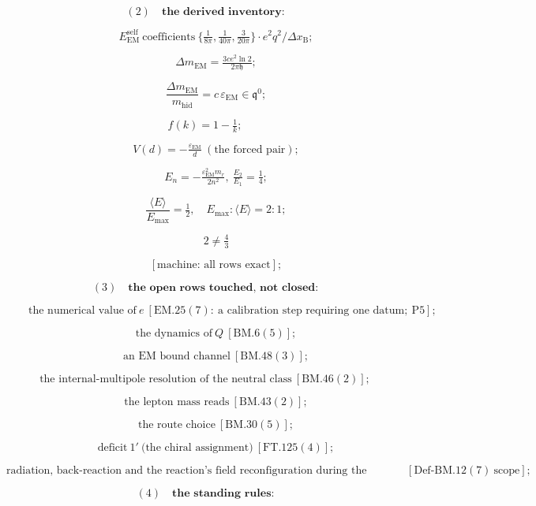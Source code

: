\documentclass[11pt,openany]{report}
\theoremstyle{canonplain}
\theoremstyle{canondef}
\begin{document}
\[
(2)\quad\textbf{the derived inventory:}
\]

\[
\qquad E_{\mathrm{EM}}^{\mathrm{self}}\ \text{coefficients}\ \bigl\{\tfrac1{8\pi},\tfrac1{40\pi},\tfrac3{20\pi}\bigr\}\cdot e^2q^2/\Delta x_{\mathrm B};
\]

\[
\qquad \Delta m_{\mathrm{EM}}=\tfrac{3ce^2\ln2}{2\pi\mathfrak h};
\]

\[
\qquad \frac{\Delta m_{\mathrm{EM}}}{m_{\mathrm{hid}}}=c\,\varepsilon_{\mathrm{EM}}\in\mathfrak q^0;
\]

\[
f(k)=1-\tfrac1k;
\]

\[
\qquad V(d)=-\tfrac{\varepsilon_{\mathrm{EM}}}d\ (\text{the forced pair});
\]

\[
\qquad E_n=-\tfrac{\varepsilon_{\mathrm{EM}}^2m_r}{2n^2},\ \tfrac{E_2}{E_1}=\tfrac14;
\]

\[
\qquad \frac{\langle E\rangle}{E_{\max}}=\tfrac12,\quad E_{\max}:\langle E\rangle=2:1;
\]

\[
\qquad 2\ne\tfrac43
\]

\[
\qquad [\text{machine: all rows exact}];
\]

\[
(3)\quad\textbf{the open rows touched, not closed:}
\]

\[
\qquad \text{the numerical value of}\ e\ [\mathrm{EM.25}(7):\ \text{a calibration step requiring one datum};\ \mathrm{P5}];
\]

\[
\qquad \text{the dynamics of}\ Q\ [\mathrm{BM.6}(5)];
\]

\[
\qquad \text{an EM bound channel}\ [\mathrm{BM.48}(3)];
\]

\[
\text{the internal-multipole resolution of the neutral class}\ [\mathrm{BM.46}(2)];
\]

\[
\qquad \text{the lepton mass reads}\ [\mathrm{BM.43}(2)];
\]

\[
\qquad \text{the route choice}\ [\mathrm{BM.30}(5)];
\]

\[
\qquad \text{deficit}\ 1'\ \text{(the chiral assignment)}\ [\mathrm{FT.125}(4)];
\]

\[
\text{radiation, back-reaction and the reaction's field reconfiguration during the transition}\ [\mathrm{Def\text{-}BM.12}(7)\ \text{scope}];
\]

\[
(4)\quad\textbf{the standing rules:}
\]
\end{document}
